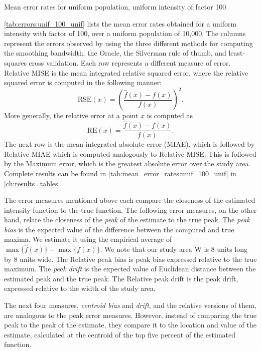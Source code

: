 \begin{table}[htbp]
\centering

\caption{Mean error rates for uniform population, uniform intensity of \gls{factor} 100}
\label{tab:errors:unif_100_unif}
\end{table}

\autoref{tab:errors:unif_100_unif} lists the mean error rates obtained for a uniform intensity with \gls{factor} of 100,
over a uniform population of 10,000.
The columns represent the errors observed by using the three different methods for computing the smoothing bandwidth:
the Oracle, the Silverman rule of thumb, and least-squares cross validation.
Each row represents a different measure of error.
Relative MISE is the mean integrated relative squared error,
where the relative squared error is computed in the following manner:
\[ \mbox{RSE}(x) = \left(\frac{\hat{f}(x)-f(x)}{f(x)}\right)^2 .\]
More generally, the relative error at a point \(x\) is computed as
\[ \mbox{RE}(x) =  \frac{\hat{f}(x)-f(x)}{f(x)} .\]
The next row is the mean integrated absolute error (MIAE),
which is followed by Relative MIAE which is computed analogously to Relative MISE.
This is followed by the Maximum error, which is the greatest absolute error over the study area.
Complete results can be found in \autoref{tab:mean_error_rates:unif_100_unif} in \autoref{ch:results_tables}.

The error measures mentioned above each compare the closeness of the estimated intensity function to the true function.
The following error measures, on the other hand, relate the closeness of the \textit{peak} of the estimate to the true peak.
The \textit{peak bias} is the expected value of the  difference between the computed and true maxima.
We estimate it using the empirical average of \(\max{\{\hat{f}(x)\}} - \max{\{f(x)\}}\).
We note that our study area \gls{W} is 8 units long by 8 units wide.
The Relative peak bias is peak bias expressed relative to the true maximum.
The \textit{peak drift} is the expected value of Euclidean distance between the estimated peak and the true peak.
The Relative peak drift is the peak drift, expressed relative to the width of the study area.

The next four measures, \textit{centroid bias} and \textit{drift}, and the relative versions of them, are analogous to the peak error measures.
However, instead of comparing the true peak to the peak of the estimate, they compare it to the location and value of the estimate, calculated at the centroid of the top five percent of the estimated function.


